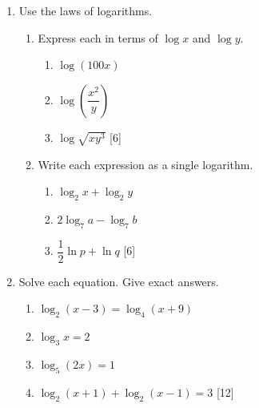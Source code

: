 \documentclass[12pt, twoside]{article}
\begin{document}
\begin{enumerate}[itemsep=0.15cm]

\newpage

\item[3.] [Maximum mark: 12]

Use the laws of logarithms.

\begin{enumerate}[itemsep=0.15cm]
  \item Express each in terms of $\log x$ and $\log y$.
  \begin{enumerate}[itemsep=0.1cm, label=(\roman*)]
    \item $\log (100x)$
    \item $\log \!\left(\dfrac{x^2}{y}\right)$
    \item $\log \sqrt{xy^3}$ \hfill [6]
  \end{enumerate}

  \item Write each expression as a single logarithm.
  \begin{enumerate}[itemsep=0.1cm, label=(\roman*)]
    \item $\log_2 x + \log_2 y$
    \item $2\log_7 a - \log_7 b$
    \item $\dfrac{1}{2}\ln p + \ln q$ \hfill [6]
  \end{enumerate}
\end{enumerate}


\newpage

\item[4.] [Maximum mark: 12]

Solve each equation. Give exact answers.

\begin{enumerate}[itemsep=0.1cm]
  \item $\log_2(x - 3) = \log_4(x + 9)$
  \item $\log_3 x = 2$
  \item $\log_5(2x) = 1$
  \item $\log_2(x+1) + \log_2(x-1) = 3$ \hfill [12]
\end{enumerate}


\end{enumerate}
\end{document}

